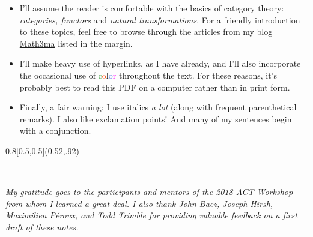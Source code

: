 \documentclass{tufte-handout-tai}
\theoremstyle{plain}
\theoremstyle{definition}
\theoremstyle{remark}
\begin{document}
	\begin{itemize}
		\item I'll assume the reader is comfortable with the basics of category theory: \textit{categories, functors} and \textit{natural transformations}. For a friendly introduction to these topics, feel free to browse through the articles from my blog \href{www.math3ma.com}{Math3ma} listed in the margin.

		\item I'll make heavy use of hyperlinks, as I have already, and I'll also incorporate the occasional use of \textcolor{Green}{c}\textcolor{OrangeRed}{o}\textcolor{Melon}{l}\textcolor{RoyalBlue}{o}\textcolor{Magenta}{r} throughout the text. For these reasons, it's probably best to read this PDF on a computer rather than in print form. 

		\item Finally, a fair warning: I use italics \textit{a lot} (along with frequent parenthetical remarks). I also like exclamation points! And many of my sentences begin with a conjunction.

	\end{itemize}
\begin{textblock}{0.8}[0.5,0.5](0.52,.92)
\rule{3cm}{0.4pt}\\[10pt]
\noindent \small{\textit{My gratitude goes to the participants and mentors of the 2018 ACT Workshop from whom I learned a great deal. I also thank John Baez, Joseph Hirsh, Maximilien P{\'e}roux, and Todd Trimble for providing valuable feedback on a first draft of these notes.}}
\end{textblock}
\end{document}
